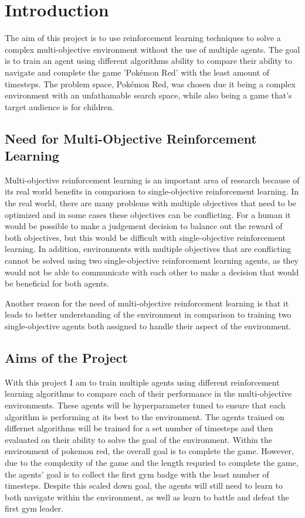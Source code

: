 \section{Introduction}

The aim of this project is to use reinforcement learning techniques to solve a complex multi-objective environment without the use of multiple agents. The goal is to train an agent using different algorithms ability to compare their ability to navigate and complete the game 'Pokémon Red' with the least amount of timesteps. The problem space, Pokémon Red, was chosen due it being a complex environment with an unfathamable search space, while also being a game that's target audience is for children.

\subsection{Need for Multi-Objective Reinforcement Learning} 

Multi-objective reinforcement learning is an important area of research because of its real world benefits in compariosn to single-objective reinforcement learning. In the real world, there are many problems with multiple objectives that need to be optimized and in some cases these objectives can be conflicting. For a human it would be possible to make a judgement decision to balance out the reward of both objectives, but this would be difficult with single-objective reinforcement learning. In addition, environments with multiple objectives that are conflicting cannot be solved using two single-objective reinforcement learning agents, as they would not be able to communicate with each other to make a decision that would be beneficial for both agents. %

Another reason for the need of multi-objective reinforcement learning is that it leads to better understanding of the environment in comparison to training two single-objective agents both assigned to handle their aspect of the environment. %

\subsection{Aims of the Project}

With this project I am to train multiple agents using different reinforcement learning algorithms to compare each of their performance in the multi-objective environments. These agents will be hyperparameter tuned to ensure that each algorithm is performing at its best to the environment. The agents trained on differnet algorithms will be trained for a set number of timesteps and then evaluated on their ability to solve the goal of the environment. Within the environment of pokemon red, the overall goal is to complete the game. However, due to the complexity of the game and the length requried to complete the game, the agents' goal is to collect the first gym badge with the least number of timesteps. Despite this scaled down goal, the agents will still need to learn to both navigate within the environment, as well as learn to battle and defeat the first gym leader.

